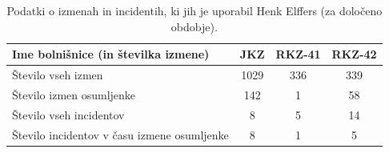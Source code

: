 \documentclass[12pt,a4paper]{amsart}
\theoremstyle{definition} %
\theoremstyle{plain} %
\begin{document}
\begin{table}[htb]
    \caption{Podatki o izmenah in incidentih, ki jih je uporabil Henk Elffers (za določeno obdobje).}
    \label{table:1}
     \begin{tabular}{l c c c}
        \hline
        Ime bolnišnice (in številka izmene) & JKZ  & RKZ-41 & RKZ-42 \\ 
        \hline
        Število vseh izmen & 1029 & 336 & 339 \\
        Število izmen osumljenke & 142 & 1 & 58 \\
        Število vseh incidentov & 8 & 5 & 14 \\
        Število incidentov v času izmene osumljenke & 8 & 1 & 5 \\ [1ex]
        \hline
     \end{tabular}
 \end{table}
\end{document}
